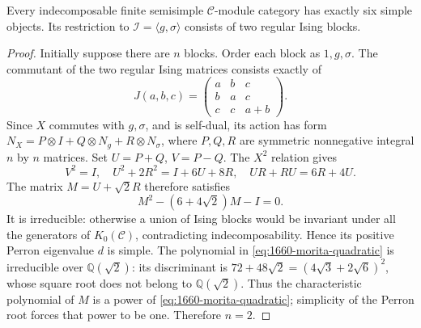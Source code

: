 \begin{theorem}
Every indecomposable finite semisimple $\mathcal C$-module category has exactly
six simple objects. Its restriction to $\mathcal I=\langle g,\sigma\rangle$
consists of two regular Ising blocks.
\end{theorem}
\begin{proof}
Initially suppose there are $n$ blocks. Order each block as $1,g,\sigma$.
The commutant of the two regular Ising matrices consists exactly of
\[
J(a,b,c)=\begin{pmatrix}a&b&c\\b&a&c\\c&c&a+b\end{pmatrix}.
\]
Since $X$ commutes with $g,\sigma$, and is self-dual, its action has form
$N_X=P\otimes I+Q\otimes N_g+R\otimes N_\sigma$,
where $P,Q,R$ are symmetric nonnegative integral $n$ by $n$ matrices.
Set $U=P+Q$, $V=P-Q$. The $X^2$ relation gives
\begin{equation}
V^2=I,\quad U^2+2R^2=I+6U+8R,\quad UR+RU=6R+4U. \label{eq:1660-morita-relations}
\end{equation}
The matrix $M=U+\sqrt2R$ therefore satisfies
\begin{equation}
M^2-(6+4\sqrt2)M-I=0. \label{eq:1660-morita-quadratic}
\end{equation}
It is irreducible: otherwise a union of Ising blocks would be invariant
under all the generators of $K_0(\mathcal C)$, contradicting indecomposability.
Hence its positive Perron eigenvalue $d$ is simple. The polynomial in
\eqref{eq:1660-morita-quadratic} is irreducible over $\mathbb Q(\sqrt2)$: its discriminant is
$72+48\sqrt2=(4\sqrt3+2\sqrt6)^2$, whose square root does not belong
to $\mathbb Q(\sqrt2)$. Thus the characteristic polynomial of $M$ is a
power of \eqref{eq:1660-morita-quadratic}; simplicity of the Perron root forces that power to be one.
Therefore $n=2$.
\end{proof}

